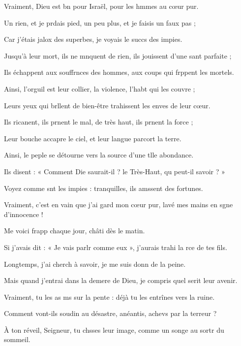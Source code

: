 \item Vraiment, Dieu est bn pour Israël, pour les hmmes au cœur pur.
\item Un rien, et je prdais pied, un peu plus, et je faisis un faux pas ;
\item Car j’étais jalox des superbes, je voyais le succs des impies.
\item Jusqu’à leur mort, ils ne mnquent de rien, ils jouissent d’une sant parfaite ;
\item Ils échappent aux souffrnces des hommes, aux coups qui frppent les mortels.
\item Ainsi, l’orguil est leur collier, la violence, l’habt qui les couvre ;
\item Leurs yeux qui brllent de bien-être trahissent les enves de leur cœur.
\item Ils ricanent, ils prnent le mal, de très haut, ils prnent la force ;
\item Leur bouche accapre le ciel, et leur langue parcort la terre.
\item Ainsi, le peple se détourne vers la source d’une tlle abondance.
\item Ils disent : « Comment Die saurait-il ? le Très-Haut, qu peut-il savoir ? »
\item Voyez comme snt les impies : tranquilles, ils amssent des fortunes.
\item Vraiment, c’est en vain que j’ai gard mon cœur pur, lavé mes mains en sgne d’innocence !
\item Me voici frapp chaque jour, châti dès le matin.
\item Si j’avais dit : « Je vais parlr comme eux », j’aurais trahi la rce de tes fils.
\item Longtemps, j’ai cherch à savoir, je me suis donn de la peine.
\item Mais quand j’entrai dans la demere de Dieu, je compris quel serit leur avenir.
\item Vraiment, tu les as ms sur la pente : déjà tu les entrînes vers la ruine.
\item Comment vont-ils soudin au désastre, anéantis, achevs par la terreur ?
\item À ton réveil, Seigneur, tu chsses leur image, comme un songe au sortr du sommeil.
